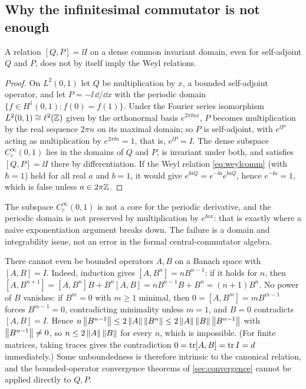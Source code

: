 \subsection{Why the infinitesimal commutator is not enough}
\begin{proposition}\label{prop:ccrcounter}
A relation $[Q,P]=\ii I$ on a dense common invariant domain, even for
self-adjoint $Q$ and $P$, does not by itself imply the Weyl relations.
\end{proposition}
\begin{proof}
On $L^2(0,1)$ let $Q$ be multiplication by $x$, a bounded self-adjoint
operator, and let $P=-\ii\,\dd/\dd x$ with the periodic domain
$\{f\in H^1(0,1):f(0)=f(1)\}$. Under the Fourier series isomorphism
$L^2(0,1)\cong\ell^2(\mathbb{Z})$ given by the orthonormal basis $e^{2\pi\ii nx}$,
$P$ becomes multiplication by the real sequence $2\pi n$ on its maximal
domain; so $P$ is self-adjoint, with $e^{\ii P}$ acting as multiplication by
$e^{2\pi\ii n}=1$, that is, $e^{\ii P}=I$. The dense subspace
$C_c^\infty(0,1)$ lies in the domains of $Q$ and $P$, is invariant under
both, and satisfies $[Q,P]=\ii I$ there by differentiation. If the Weyl
relation \eqref{eq:weylcomm} (with $\hbar=1$) held for all real $a$ and
$b=1$, it would give $e^{\ii aQ}=e^{-\ii a}e^{\ii aQ}$, hence $e^{-\ii a}=1$,
which is false unless $a\in2\pi\mathbb{Z}$.
\end{proof}
The subspace $C_c^\infty(0,1)$ is not a core for the periodic derivative,
and the periodic domain is not preserved by multiplication by $e^{\ii ax}$:
that is exactly where a naive exponentiation argument breaks down. The
failure is a domain and integrability issue, not an error in the formal
central-commutator algebra.

There cannot even be bounded operators $A,B$ on a Banach space with
$[A,B]=I$. Indeed, induction gives $[A,B^n]=nB^{n-1}$: if it holds for
$n$, then $[A,B^{n+1}]=[A,B^n]B+B^n[A,B]=nB^{n-1}B+B^n=(n+1)B^n$. No power
of $B$ vanishes: if $B^m=0$ with $m\geq1$ minimal, then
$0=[A,B^m]=mB^{m-1}$ forces $B^{m-1}=0$, contradicting minimality unless
$m=1$, and $B=0$ contradicts $[A,B]=I$. Hence
$n\left\lVert B^{n-1}\right\rVert\leq2\left\lVert A\right\rVert\left\lVert B^n\right\rVert\leq2\left\lVert A\right\rVert\left\lVert B\right\rVert\left\lVert B^{n-1}\right\rVert$
with $\left\lVert B^{n-1}\right\rVert\neq0$, so $n\leq2\left\lVert A\right\rVert\left\lVert B\right\rVert$ for every $n$, which
is impossible. (For finite matrices, taking traces gives the contradiction
$0=\operatorname{tr}[A,B]=\operatorname{tr} I=d$ immediately.) Some unboundedness is therefore
intrinsic to the canonical relation, and the bounded-operator convergence
theorems of \cref{sec:convergence} cannot be applied directly to $Q,P$.

